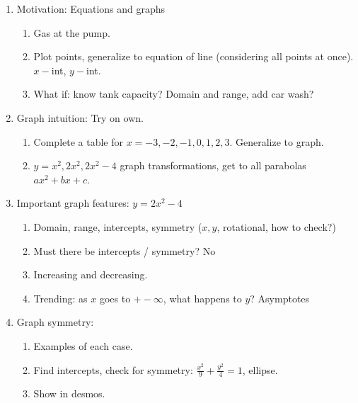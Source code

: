 \documentclass{article}
\begin{document}
\begin{enumerate}

\item Motivation: Equations and graphs
\begin{enumerate}
\item Gas at the pump. 
\item Plot points, generalize to equation of line (considering all points at once). $x-$int, $y-$int.
\item What if: know tank capacity? Domain and range, add car wash?
\end{enumerate}

\item Graph intuition: Try on own.
\begin{enumerate}
\item Complete a table for $x=-3,-2,-1,0,1,2,3$. Generalize to graph. 
\item $y=x^2, 2x^2, 2x^2-4$ graph transformations, get to all parabolas $ax^2+bx+c$.
\end{enumerate}

\item Important graph features: $y=2x^2-4$
\begin{enumerate}
\item Domain, range, intercepts, symmetry ($x, y$, rotational, how to check?)
\item Must there be intercepts / symmetry? No
\item Increasing and decreasing.
\item Trending: as $x$ goes to $+-\infty$, what happens to $y$? Asymptotes
\end{enumerate} 

\item Graph symmetry:
\begin{enumerate}
\item Examples of each case. 
\item Find intercepts, check for symmetry: $\frac{x^2}{9}+\frac{y^2}{4}=1$, ellipse.
\item Show in desmos.	
\end{enumerate}


\end{enumerate}
\end{document}
